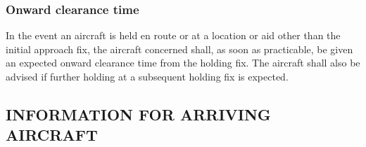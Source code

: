 \documentclass[../main.tex]{subfiles}
\begin{document}
    \subsubsection{Onward clearance time} \label{6.5.8}

    In the event an aircraft is held en route or at a location or aid other than the initial approach fix, the aircraft concerned shall, as soon as practicable, be given an expected onward clearance time from the holding fix. The aircraft shall also be advised if further holding at a subsequent holding fix is expected.


    \subsection[Information for arriving aircraft]{INFORMATION FOR ARRIVING AIRCRAFT}

    \begin{enumempty}[labelindent=\parindent]
        \item {}
    \end{enumempty}
\end{document}
